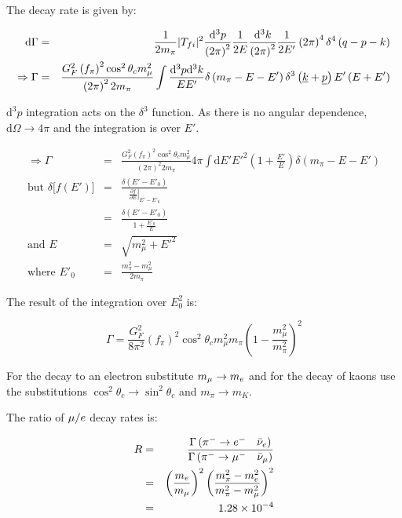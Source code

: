 The decay rate is given by:

\begin{eqnarray*}
  \mathrm{d}\Gamma & = & \frac{1}{2m_{\pi}}|T_{fi}|^2\frac{\mathrm{d}^3p}{\left(2\pi\right)^2}\frac{1}{2E} \frac{\mathrm{d}^3k}{\left(2\pi\right)^2}\frac{1}{2E'}\left(2\pi\right)^4\delta^4\left(q - p - k\right) \\
  \Rightarrow \Gamma & = & \frac{G_F^2\left(f_{\pi}\right)^2\cos^2\theta_cm^2_{\mu}}{\left(2\pi\right)^2 2m_{\pi}}\int\frac{\mathrm{d}^3p\mathrm{d}^3k}{EE'}\delta\left(m_{\pi} - E - E'\right)\delta^3\left(\underline{k} + \underline{p}\right)E'\left(E + E'\right)
\end{eqnarray*}

$\mathrm{d}^3p$ integration acts on the $\delta^3$ function.  As there is no angular dependence, $\mathrm{d}\Omega \to 4\pi$ and the integration is over $E'$.

\begin{eqnarray*}
  \Rightarrow \Gamma & = & \frac{G_F^2\left(f_{\pi}\right)^2\cos^2\theta_c m^2_{\mu}}{\left(2\pi\right)^2 2m_{\pi}}4\pi\int\mathrm{d}E' E'^{2}\left(1 + \frac{E'}{E}\right)\delta\left(m_{\pi} - E - E'\right) \\
  \textrm{but } \delta\Big[f\left(E'\right)\Big] & = & \frac{\delta\left(E' - E'_0\right)}{\left.\frac{\partial f}{\partial E}\right|_{E' - E'_0}} \\
  & = & \frac{\delta\left(E' - E'_0\right)}{1 + \frac{E'_0}{E}} \\
  \textrm{and } E & = & \sqrt{m^2_{\mu} + E'^2} \\
  \textrm{where } E'_0 & = & \frac{m^2_{\pi} - m^2_{\mu}}{2m_{\pi}}
\end{eqnarray*}

The result of the integration over $E_0^2$ is:

\[
  \Gamma = \frac{G_F^2}{8\pi^2}\left(f_{\pi}\right)^2\cos^2\theta_c m^2_{\mu}m_{\pi}\left(1 - \frac{m^2_{\mu}}{m^2_{\pi}}\right)^2
\]

For the decay to an electron substitute $m_{\mu} \to m_{e}$ and for the decay of kaons use the substitutions $\cos^2\theta_c \to \sin^2\theta_c$ and $m_{\pi} \to m_K$.

The ratio of $\mu/e$ decay rates is:

\begin{eqnarray*}
  R & = & \frac{\Gamma\left(\pi^- \to e^- \quad \bar{\nu}_{e}\right)}{\Gamma\left(\pi^- \to \mu^- \quad \bar{\nu}_{\mu}\right)} \\
  & = &
  \left(\frac{m_{e}}{m_{\mu}}\right)^2\left(\frac{m^2_{\pi} - m^2_{e}}{m^2_{\pi} - m^2_{\mu}}\right)^2 \\
  & = & 1.28 \times 10^{-4}
\end{eqnarray*}

